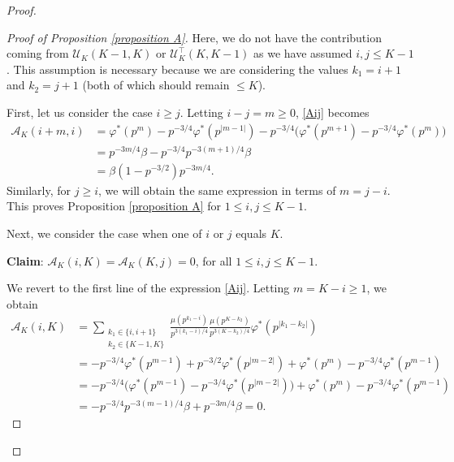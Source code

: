 \documentclass[a4paper,12pt, reqn0]{amsart}
\theoremstyle{remark}
\newcommand{\bt}{\beta}
\newcommand{\U}{\mathcal{U}}
\newcommand{\A}{\mathcal{A}}
\begin{document}
\begin{proof}
\begin{proof}[Proof of Proposition \ref{proposition A}]
Here, we do not have the contribution coming from $\U_K(K-1, K)$ or $\U_K^{\top} (K, K-1)$ as we have assumed $i, j \leq K-1$. This assumption is necessary because we are considering the values $k_1 = i+1$ and $k_2 = j+1$ (both of which should remain $\leq K$). 

\medskip

First, let us consider the case $i \geq j$. Letting $i-j = m \geq 0$, \eqref{Aij} becomes 
\begin{equation*}
\begin{split}
\A_K(i+m, i) &= \varphi^*(p^m)  - p^{-3/4} \varphi^*(p^{|m-1|}) - p^{-3/4} \bigl( \varphi^*(p^{m+1}) - p^{-3/4} \varphi^*(p^m) \bigr) \\
&= p^{-3m/4} \bt - p^{-3/4} p^{-3(m+1)/4} \bt \\
&= \bt(1 - p^{-3/2}) p^{-3m/4}.
\end{split}
\end{equation*}
%
Similarly, for $j \geq i$, we will obtain the same expression in terms of $m = j-i$. This proves Proposition \ref{proposition A} for $1 \leq i,j \leq K-1$. 

\medskip

Next, we consider the case when one of $i$ or $j$ equals $K$. 

\textbf{Claim}: $\A_K(i,K) = \A_K(K, j) = 0$, for all $1 \leq i, j \leq K-1$. 

We revert to the first line of the expression \eqref{Aij}. Letting $m = K-i \geq 1$, we obtain
\begin{equation*}
\begin{split}
\A_K(i, K) 
&= \sum\limits_{\substack{k_1 \in \{i, i+1\}\\ k_2 \in \{K-1, K\}}} \frac{\mu(p^{k_1 - i})}{p^{3(k_1 - i)/4}} \frac{\mu(p^{K-k_2})}{p^{3(K-k_2)/4}} \varphi^*(p^{|k_1 - k_2|})\\
&= - p^{-3/4} \varphi^*(p^{m-1})  + p^{-3/2} \varphi^*(p^{|m-2|}) + \varphi^*(p^m)  - p^{-3/4} \varphi^*(p^{m-1}) \\
&= -p^{-3/4} \big( \varphi^*(p^{m-1}) - p^{-3/4} \varphi^*(p^{|m-2|})  \bigr) + \varphi^*(p^m)  - p^{-3/4} \varphi^*(p^{m-1})\\
&= -p^{-3/4} p^{-3(m-1)/4} \bt  +  p^{-3m/4} \bt
= 0.
\end{split}
\end{equation*}


\end{proof}
\end{proof}
\end{document}
